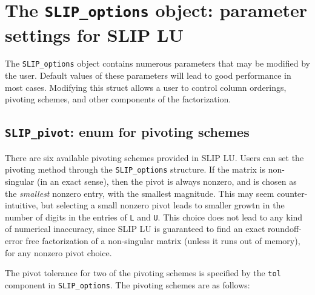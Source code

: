 \documentclass[12pt]{article}
\theoremstyle{definition}
\begin{document}
\cprotect\section{The \verb|SLIP_options| object:
parameter settings for SLIP LU} \label{ss:SLIP_options}

The \verb|SLIP_options| object contains numerous parameters that may be
modified by the user. Default values of these parameters will lead to good
performance in most cases.  Modifying this struct allows a user to
control column orderings, pivoting schemes, and other components of the
factorization.

\cprotect\subsection{\verb|SLIP_pivot|: enum for pivoting schemes}
\label{ss:SLIP_pivot}

There are six available pivoting schemes provided in SLIP LU.  Users can set
the pivoting method through the \verb|SLIP_options| structure.  If the matrix
is non-singular (in an exact sense), then the pivot is always nonzero, and is
chosen as the {\em smallest} nonzero entry, with the smallest magnitude.  This
may seem counter-intuitive, but selecting a small nonzero pivot leads to
smaller growtn in the number of digits in the entries of \verb|L| and \verb|U|.
This choice does not lead to any kind of numerical inaccuracy, since SLIP LU is
guaranteed to find an exact roundoff-error free factorization of a non-singular
matrix (unless it runs out of memory), for any nonzero pivot choice.

The pivot tolerance for two of the pivoting schemes is specified by the
\verb|tol| component in \verb|SLIP_options|.  The pivoting schemes are as
follows:
\end{document}
